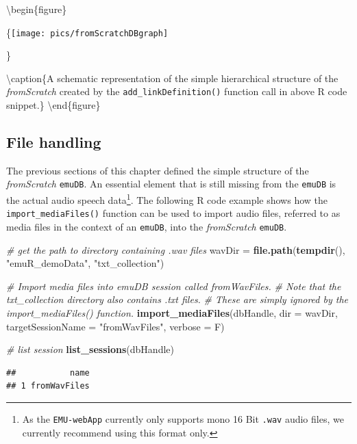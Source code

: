 \documentclass[]{book}
\newenvironment{Shaded}{\begin{snugshade}}{\end{snugshade}}
\newcommand{\CommentTok}[1]{\textcolor[rgb]{0.56,0.35,0.01}{\textit{#1}}}
\newcommand{\DataTypeTok}[1]{\textcolor[rgb]{0.13,0.29,0.53}{#1}}
\newcommand{\KeywordTok}[1]{\textcolor[rgb]{0.13,0.29,0.53}{\textbf{#1}}}
\newcommand{\NormalTok}[1]{#1}
\newcommand{\StringTok}[1]{\textcolor[rgb]{0.31,0.60,0.02}{#1}}
\let\rmarkdownfootnote\footnote%
\def\footnote{\protect\rmarkdownfootnote}
\begin{document}
\textbackslash{}begin\{figure\}

\{\centering \texttt{[image: pics/fromScratchDBgraph]}

\}

\textbackslash{}caption\{A schematic representation of the simple hierarchical structure of the \emph{fromScratch} created by the \texttt{add\_linkDefinition()} function call in above R code snippet.\}\label{fig:emuDB-fromScratchHier}
\textbackslash{}end\{figure\}

\hypertarget{file-handling}{%
\subsection{File handling}\label{file-handling}}

The previous sections of this chapter defined the simple structure of the \emph{fromScratch} \texttt{emuDB}. An essential element that is still missing from the \texttt{emuDB} is the actual audio speech data\footnote{As the \texttt{EMU-webApp} currently only supports mono 16 Bit \texttt{.wav} audio files, we currently recommend using this format only.}. The following R code example shows how the \texttt{import\_mediaFiles()} function can be used to import audio files, referred to as media files in the context of an \texttt{emuDB}, into the \emph{fromScratch} \texttt{emuDB}.

\begin{Shaded}
\begin{Highlighting}[]
\CommentTok{# get the path to directory containing .wav files}
\NormalTok{wavDir =}\StringTok{ }\KeywordTok{file.path}\NormalTok{(}\KeywordTok{tempdir}\NormalTok{(), }\StringTok{"emuR_demoData"}\NormalTok{, }\StringTok{"txt_collection"}\NormalTok{)}

\CommentTok{# Import media files into emuDB session called fromWavFiles.}
\CommentTok{# Note that the txt_collection directory also contains .txt files.}
\CommentTok{# These are simply ignored by the import_mediaFiles() function.}
\KeywordTok{import_mediaFiles}\NormalTok{(dbHandle,}
                  \DataTypeTok{dir =}\NormalTok{ wavDir,}
                  \DataTypeTok{targetSessionName =} \StringTok{"fromWavFiles"}\NormalTok{,}
                  \DataTypeTok{verbose =}\NormalTok{ F)}

\CommentTok{# list session}
\KeywordTok{list_sessions}\NormalTok{(dbHandle)}
\end{Highlighting}
\end{Shaded}

\begin{verbatim}
##           name
## 1 fromWavFiles
\end{verbatim}
\end{document}
